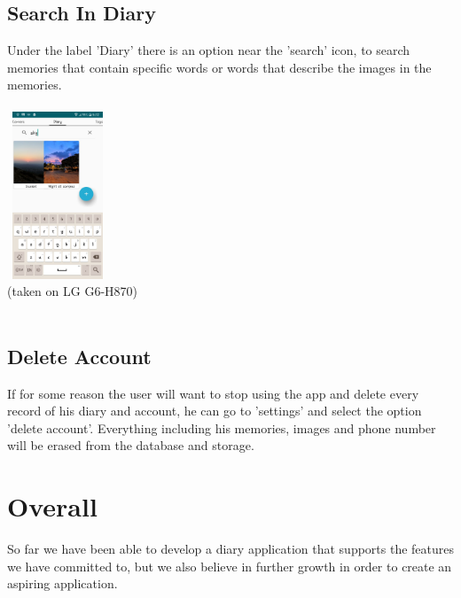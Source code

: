 \documentclass{article}
\begin{document}
\subsection{Search In Diary}
Under the label 'Diary' there is an option near the 'search' icon, to search memories that contain specific words or words that describe the images in the memories.
\\\\
\includegraphics[width=3cm, height=5cm]{searchDiary}\\
{\small(taken on LG G6-H870)}
\\\\
\subsection{Delete Account}
If for some reason the user will want to stop using the app and delete every record of his diary and account, he can go to 'settings' and select the option 'delete account'. Everything including his memories, images and phone number will be erased from the database and storage.

\section{Overall}
So far we have been able to develop a diary application that supports the features we have committed to, but we also believe in further growth in order to create an aspiring application.
\end{document}
